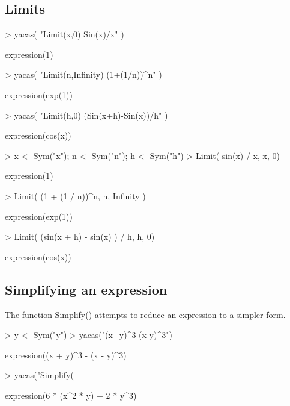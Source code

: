 \documentclass[10pt]{article}
\begin{document}
\subsection{Limits}
\begin{Schunk}
\begin{Sinput}
> yacas( "Limit(x,0) Sin(x)/x" )
\end{Sinput}
\begin{Soutput}
expression(1)
\end{Soutput}
\begin{Sinput}
> yacas( "Limit(n,Infinity) (1+(1/n))^n" )
\end{Sinput}
\begin{Soutput}
expression(exp(1))
\end{Soutput}
\begin{Sinput}
> yacas( "Limit(h,0) (Sin(x+h)-Sin(x))/h" )
\end{Sinput}
\begin{Soutput}
expression(cos(x))
\end{Soutput}
\end{Schunk}

\begin{Schunk}
\begin{Sinput}
> x <- Sym("x"); n <- Sym("n"); h <- Sym("h")
> Limit( sin(x) / x, x, 0)
\end{Sinput}
\begin{Soutput}
expression(1)
\end{Soutput}
\begin{Sinput}
> Limit( (1 + (1 / n))^n, n, Infinity )
\end{Sinput}
\begin{Soutput}
expression(exp(1))
\end{Soutput}
\begin{Sinput}
> Limit( (sin(x + h) - sin(x) ) / h, h, 0)
\end{Sinput}
\begin{Soutput}
expression(cos(x))
\end{Soutput}
\end{Schunk}


\subsection{Simplifying an expression}

The function Simplify() attempts to reduce an expression
to a simpler form.
\begin{Schunk}
\begin{Sinput}
> y <- Sym("y")
> yacas("(x+y)^3-(x-y)^3")
\end{Sinput}
\begin{Soutput}
expression((x + y)^3 - (x - y)^3)
\end{Soutput}
\begin{Sinput}
> yacas("Simplify(%)")
\end{Sinput}
\begin{Soutput}
expression(6 * (x^2 * y) + 2 * y^3)
\end{Soutput}
\end{Schunk}
\end{document}
